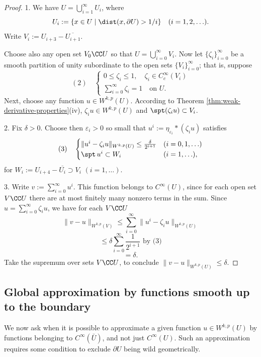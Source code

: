 \begin{proof}
1. We have $U = \bigcup_{i=1}^\infty U_i$, where
$$U_i := \{x \in U \mid \dist(x, \partial U) > 1/i\} \quad (i = 1, 2, \ldots).$$
Write $V_i := U_{i+3} - \overline{U_{i+1}}$.

Choose also any open set $V_0 \CC U$ so that $U = \bigcup_{i=0}^\infty V_i$. Now let $\{\zeta_i\}_{i=0}^\infty$ be a smooth partition of unity subordinate to the open sets $\{V_i\}_{i=0}^\infty$; that is, suppose
$$(2) \quad \begin{cases} 0 \le \zeta_i \le 1, \quad \zeta_i \in C_c^\infty(V_i) \\ \sum_{i=0}^\infty \zeta_i = 1 \quad \text{on } U. \end{cases}$$
Next, choose any function $u \in W^{k,p}(U)$. According to Theorem \ref{thm:weak-derivative-properties}(iv), $\zeta_i u \in W^{k,p}(U)$ and $\spt(\zeta_i u) \subset V_i$.

2. Fix $\delta > 0$. Choose then $\varepsilon_i > 0$ so small that $u^i := \eta_{\varepsilon_i} * (\zeta_i u)$ satisfies
$$(3) \quad \begin{cases}
\|u^i - \zeta_i u\|_{W^{k,p}(U)} \le \frac{\delta}{2^{i+1}} & (i = 0,1,\ldots) \\
\spt\, u^i \subset W_i & (i = 1,\ldots),
\end{cases}$$
for $W_i := U_{i+4} - \overline{U_i} \supset V_i$ $(i = 1,\ldots)$.

3. Write $v := \sum_{i=0}^\infty u^i$. This function belongs to $C^\infty(U)$, since for each open set $V \CC U$ there are at most finitely many nonzero terms in the sum. Since $u = \sum_{i=0}^\infty \zeta_i u$, we have for each $V \CC U$
$$\|v - u\|_{W^{k,p}(V)} \le \sum_{i=0}^\infty \|u^i - \zeta_i u\|_{W^{k,p}(U)}$$
$$\le \delta \sum_{i=0}^\infty \frac{1}{2^{i+1}} \text{ by (3)}$$
$$= \delta.$$
Take the supremum over sets $V \CC U$, to conclude $\|v - u\|_{W^{k,p}(U)} \le \delta$.
\end{proof}

\subsection{Global approximation by functions smooth up to the boundary}

We now ask when it is possible to approximate a given function $u \in W^{k,p}(U)$ by functions belonging to $C^\infty(\bar U)$, and not just $C^\infty(U)$. Such an approximation requires some condition to exclude $\partial U$ being wild geometrically.


